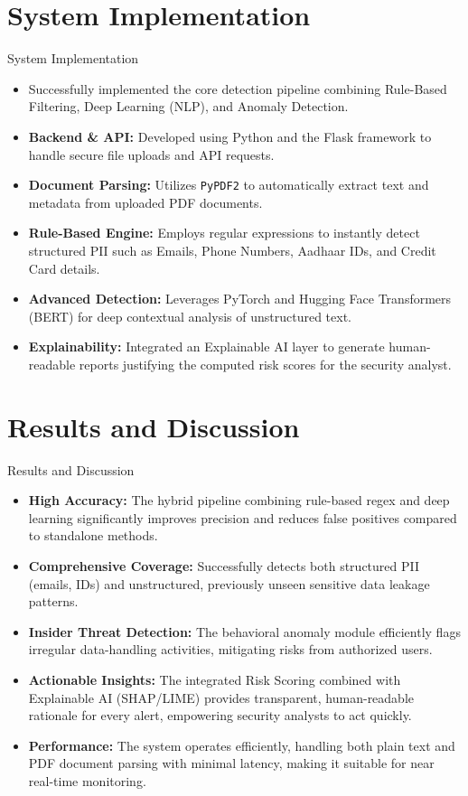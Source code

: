 \documentclass{beamer}
\begin{document}
\section{System Implementation}
\begin{frame}[allowframebreaks]{System Implementation}
\begin{itemize}
\justifying
    \item Successfully implemented the core detection pipeline combining Rule-Based Filtering, Deep Learning (NLP), and Anomaly Detection.
    \item \textbf{Backend \& API:} Developed using Python and the Flask framework to handle secure file uploads and API requests.
    \item \textbf{Document Parsing:} Utilizes \texttt{PyPDF2} to automatically extract text and metadata from uploaded PDF documents.
    \item \textbf{Rule-Based Engine:} Employs regular expressions to instantly detect structured PII such as Emails, Phone Numbers, Aadhaar IDs, and Credit Card details.
    \item \textbf{Advanced Detection:} Leverages PyTorch and Hugging Face Transformers (BERT) for deep contextual analysis of unstructured text.
    \item \textbf{Explainability:} Integrated an Explainable AI layer to generate human-readable reports justifying the computed risk scores for the security analyst.
\end{itemize}
\end{frame}

\section{Results and Discussion}
\begin{frame}[allowframebreaks]{Results and Discussion}
\begin{itemize}
\justifying
    \item \textbf{High Accuracy:} The hybrid pipeline combining rule-based regex and deep learning significantly improves precision and reduces false positives compared to standalone methods.
    \item \textbf{Comprehensive Coverage:} Successfully detects both structured PII (emails, IDs) and unstructured, previously unseen sensitive data leakage patterns.
    \item \textbf{Insider Threat Detection:} The behavioral anomaly module efficiently flags irregular data-handling activities, mitigating risks from authorized users.
    \item \textbf{Actionable Insights:} The integrated Risk Scoring combined with Explainable AI (SHAP/LIME) provides transparent, human-readable rationale for every alert, empowering security analysts to act quickly.
    \item \textbf{Performance:} The system operates efficiently, handling both plain text and PDF document parsing with minimal latency, making it suitable for near real-time monitoring.
\end{itemize}
\end{frame}
\end{document}
